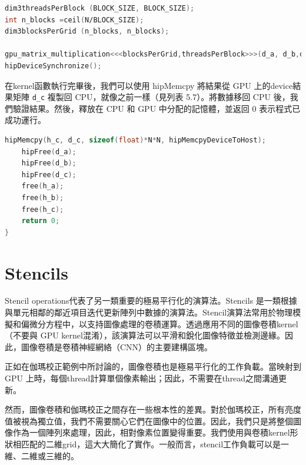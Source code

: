 \lstset{style=mystyle}
\begin{lstlisting}[language=c++,caption={kernel啟動}]
dim3threadsPerBlock (BLOCK_SIZE, BLOCK_SIZE);
int n_blocks =ceil(N∕BLOCK_SIZE);
dim3blocksPerGrid (n_blocks, n_blocks);

gpu_matrix_multiplication<<<blocksPerGrid,threadsPerBlock>>>(d_a, d_b,d_c, N);
hipDeviceSynchronize();
\end{lstlisting}

\vspace{1em}
在kernel函數執行完畢後，我們可以使用 hipMemcpy 將結果從 GPU 上的device結果矩陣 \texttt{d\_c} 複製回 CPU，就像之前一樣（見列表 5.7）。將數據移回 CPU 後，我們驗證結果。然後，釋放在 CPU 和 GPU 中分配的記憶體，並返回 0 表示程式已成功運行。

\lstset{style=mystyle}
\begin{lstlisting}[language=c++,caption={資料傳輸（host到device）和記憶體釋放}]
    hipMemcpy(h_c, d_c, sizeof(float)*N*N, hipMemcpyDeviceToHost);
    hipFree(d_a);
    hipFree(d_b);
    hipFree(d_c);
    free(h_a);
    free(h_b);
    free(h_c);
    return 0;
}
\end{lstlisting}
\section{Stencils}
\vspace{1em}
Stencil operations代表了另一類重要的極易平行化的演算法。Stencils 是一類根據與單元相鄰的鄰近項目迭代更新陣列中數據的演算法。Stencil演算法常用於物理模擬和偏微分方程中，以支持圖像處理的卷積運算。透過應用不同的圖像卷積kernel（不要與 GPU kernel混淆），該演算法可以平滑和銳化圖像特徵並檢測邊緣。因此，圖像卷積是卷積神經網絡（CNN）的主要建構區塊。

\vspace{1em}
正如在伽瑪校正範例中所討論的，圖像卷積也是極易平行化的工作負載。當映射到 GPU 上時，每個thread計算單個像素輸出；因此，不需要在thread之間溝通更新。

\vspace{1em}
然而，圖像卷積和伽瑪校正之間存在一些根本性的差異。對於伽瑪校正，所有亮度值被視為獨立值，我們不需要關心它們在圖像中的位置。因此，我們只是將整個圖像作為一個陣列來處理，因此，相對像素位置變得重要。我們使用與卷積kernel形狀相匹配的二維grid，這大大簡化了實作。一般而言，stencil工作負載可以是一維、二維或三維的。

